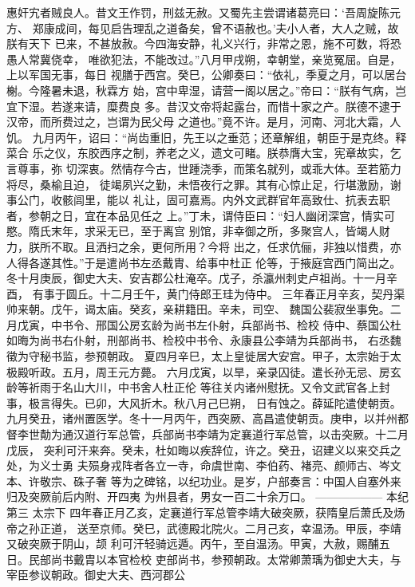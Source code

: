 \documentclass[12pt,UTF8]{ctexbook}
\begin{document}
惠奸宄者贼良人。昔文王作罚，刑兹无赦。又蜀先主尝谓诸葛亮曰：‘吾周旋陈元方、
郑康成间，每见启告理乱之道备矣，曾不语赦也。’夫小人者，大人之贼，故朕有天下
已来，不甚放赦。今四海安静，礼义兴行，非常之恩，施不可数，将恐愚人常冀侥幸，
唯欲犯法，不能改过。”八月甲戌朔，幸朝堂，亲览冤屈。自是，上以军国无事，每日
视膳于西宫。癸巳，公卿奏曰：“依礼，季夏之月，可以居台榭。今隆暑未退，秋霖方
始，宫中卑湿，请营一阁以居之。”帝曰：“朕有气病，岂宜下湿。若遂来请，糜费良
多。昔汉文帝将起露台，而惜十家之产。朕德不逮于汉帝，而所费过之，岂谓为民父母
之道也。”竟不许。是月，河南、河北大霜，人饥。
九月丙午，诏曰：“尚齿重旧，先王以之垂范；还章解组，朝臣于是克终。释菜合
乐之仪，东胶西序之制，养老之义，遗文可睹。朕恭膺大宝，宪章故实，乞言尊事，弥
切深衷。然情存今古，世踵浇季，而策名就列，或乖大体。至若筋力将尽，桑榆且迫，
徒竭夙兴之勤，未悟夜行之罪。其有心惊止足，行堪激励，谢事公门，收骸闾里，能以
礼让，固可嘉焉。内外文武群官年高致仕、抗表去职者，参朝之日，宜在本品见任之
上。”丁未，谓侍臣曰：“妇人幽闭深宫，情实可愍。隋氏末年，求采无已，至于离宫
别馆，非幸御之所，多聚宫人，皆竭人财力，朕所不取。且洒扫之余，更何所用？今将
出之，任求伉俪，非独以惜费，亦人得各遂其性。”于是遣尚书左丞戴胄、给事中杜正
伦等，于掖庭宫西门简出之。
冬十月庚辰，御史大夫、安吉郡公杜淹卒。戊子，杀瀛州刺史卢祖尚。十一月辛酉，
有事于圆丘。十二月壬午，黄门侍郎王珪为侍中。
三年春正月辛亥，契丹渠帅来朝。戊午，谒太庙。癸亥，亲耕籍田。辛未，司空、
魏国公裴寂坐事免。二月戊寅，中书令、邢国公房玄龄为尚书左仆射，兵部尚书、检校
侍中、蔡国公杜如晦为尚书右仆射，刑部尚书、检校中书令、永康县公李靖为兵部尚书，
右丞魏徵为守秘书监，参预朝政。
夏四月辛巳，太上皇徙居大安宫。甲子，太宗始于太极殿听政。五月，周王元方薨。
六月戊寅，以旱，亲录囚徒。遣长孙无忌、房玄龄等祈雨于名山大川，中书舍人杜正伦
等往关内诸州慰抚。又令文武官各上封事，极言得失。已卯，大风折木。秋八月己巳朔，
日有蚀之。薛延陀遣使朝贡。
九月癸丑，诸州置医学。冬十一月丙午，西突厥、高昌遣使朝贡。庚申，以并州都
督李世勣为通汉道行军总管，兵部尚书李靖为定襄道行军总管，以击突厥。十二月戊辰，
突利可汗来奔。癸未，杜如晦以疾辞位，许之。癸丑，诏建义以来交兵之处，为义士勇
夫殒身戎阵者各立一寺，命虞世南、李伯药、褚亮、颜师古、岑文本、许敬宗、硃子奢
等为之碑铭，以纪功业。是岁，户部奏言：中国人自塞外来归及突厥前后内附、开四夷
为州县者，男女一百二十余万口。
------------------
本纪第三 太宗下    
四年春正月乙亥，定襄道行军总管李靖大破突厥，获隋皇后萧氏及炀帝之孙正道，
送至京师。癸巳，武德殿北院火。二月己亥，幸温汤。甲辰，李靖又破突厥于阴山，颉
利可汗轻骑远遁。丙午，至自温汤。甲寅，大赦，赐酺五日。民部尚书戴胄以本官检校
吏部尚书，参预朝政。太常卿萧瑀为御史大夫，与宰臣参议朝政。御史大夫、西河郡公
\end{document}
